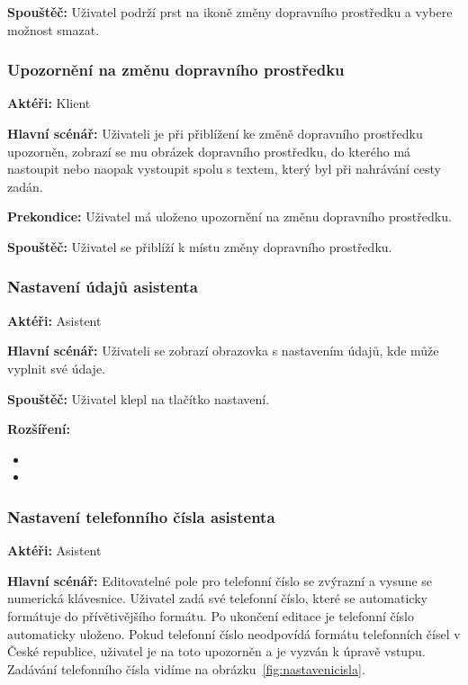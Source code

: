 \documentclass[czech,master,public,dept460,male,java,cpdeclaration]{diploma}
\newcommand{\usecase}[2]{\subsubsection{#1}\label{#2}}
\begin{document}
\vspace{0.1cm}
\noindent
\textbf{Spouštěč:} Uživatel podrží prst na ikoně změny dopravního prostředku a vybere možnost smazat.


\usecase{Upozornění na změnu dopravního prostředku}{upozorneniprostredek}
\textbf{Aktéři:} Klient

\vspace{0.1cm}
\noindent
\textbf{Hlavní scénář:} Uživateli je při přiblížení ke změně dopravního prostředku upozorněn,
zobrazí se mu obrázek dopravního prostředku, do kterého má nastoupit nebo naopak vystoupit spolu
s textem, který byl při nahrávání cesty zadán.

\vspace{0.1cm}
\noindent
\textbf{Prekondice:} Uživatel má uloženo upozornění na změnu dopravního prostředku.

\vspace{0.1cm}
\noindent
\textbf{Spouštěč:} Uživatel se přiblíží k místu změny dopravního prostředku.


\usecase{Nastavení údajů asistenta}{nastaveniudaju}
\textbf{Aktéři:} Asistent

\vspace{0.1cm}
\noindent
\textbf{Hlavní scénář:} Uživateli se zobrazí obrazovka s nastavením údajů, kde může vyplnit své údaje.

\vspace{0.1cm}
\noindent
\textbf{Spouštěč:} Uživatel klepl na tlačítko nastavení.

\vspace{0.1cm}
\noindent
\textbf{Rozšíření:}
\begin{itemize}
  \item {}
  \item {}
\end{itemize}



\usecase{Nastavení telefonního čísla asistenta}{nastavenicisla}
\textbf{Aktéři:} Asistent

\vspace{0.1cm}
\noindent
\textbf{Hlavní scénář:} Editovatelné pole pro telefonní číslo se zvýrazní a vysune se numerická klávesnice.
Uživatel zadá své telefonní číslo, které se automaticky formátuje do přívětivějšího formátu. Po ukončení
editace je telefonní číslo automaticky uloženo. Pokud telefonní číslo neodpovídá formátu telefonních čísel
v České republice, uživatel je na toto upozorněn a je vyzván k úpravě vstupu. Zadávání telefonního čísla
vidíme na obrázku~\ref{fig:nastavenicisla}.
\end{document}
